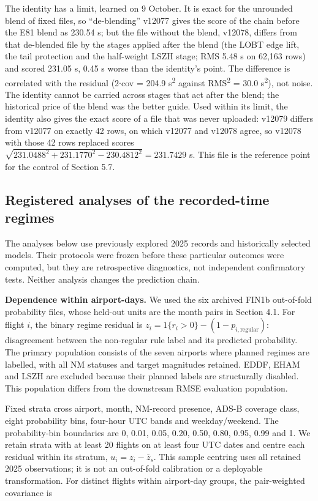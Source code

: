 \documentclass[
  manuscript=article,  %
  layout=preprint,     %
  year=2026,
  volume=4,
]{extra/joas}
\begin{document}
The identity has a limit, learned on 9 October. It is exact for the unrounded blend of fixed files, so ``de-blending'' v12077 gives the score of the chain before the E81 blend as 230.54 s; but the file without the blend, v12078, differs from that de-blended file by the stages applied after the blend (the LOBT edge lift, the tail protection and the half-weight LSZH stage; RMS 5.48 s on 62,163 rows) and scored 231.05 s, 0.45 s worse than the identity's point. The difference is correlated with the residual (2$\cdot$cov = 204.9 s\textsuperscript{2} against RMS\textsuperscript{2} = 30.0 s\textsuperscript{2}), not noise. The identity cannot be carried across stages that act after the blend; the historical price of the blend was the better guide. Used within its limit, the identity also gives the exact score of a file that was never uploaded: v12079 differs from v12077 on exactly 42 rows, on which v12077 and v12078 agree, so v12078 with those 42 rows replaced scores \(\sqrt{231.0488^2 + 231.1770^2 - 230.4812^2} = 231.7429\) s. This file is the reference point for the control of Section 5.7.

\subsection{Registered analyses of the recorded-time regimes}\label{registered-analyses-of-the-recorded-time-regimes}

The analyses below use previously explored 2025 records and historically selected models. Their protocols were frozen before these particular outcomes were computed, but they are retrospective diagnostics, not independent confirmatory tests. Neither analysis changes the prediction chain.

\textbf{Dependence within airport-days.} We used the six archived FIN1b out-of-fold probability files, whose held-out units are the month pairs in Section 4.1. For flight \(i\), the binary regime residual is \(z_i = 1\{r_i > 0\} - (1-p_{i,\mathrm{regular}})\): disagreement between the non-regular rule label and its predicted probability. The primary population consists of the seven airports where planned regimes are labelled, with all NM statuses and target magnitudes retained. EDDF, EHAM and LSZH are excluded because their planned labels are structurally disabled. This population differs from the downstream RMSE evaluation population.

Fixed strata cross airport, month, NM-record presence, ADS-B coverage class, eight probability bins, four-hour UTC bands and weekday/weekend. The probability-bin boundaries are 0, 0.01, 0.05, 0.20, 0.50, 0.80, 0.95, 0.99 and 1. We retain strata with at least 20 flights on at least four UTC dates and centre each residual within its stratum, \(u_i=z_i-\bar z_s\). This sample centring uses all retained 2025 observations; it is not an out-of-fold calibration or a deployable transformation. For distinct flights within airport-day groups, the pair-weighted covariance is
\end{document}
